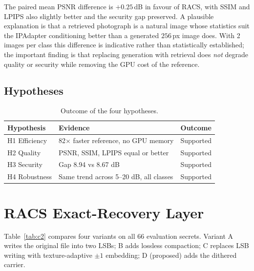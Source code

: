 The paired mean PSNR difference is $+0.25$\,dB in favour of RACS, with SSIM and LPIPS also
slightly better and the security gap preserved. A plausible explanation is that a retrieved
photograph is a natural image whose statistics suit the IPAdapter conditioning better than a
generated $256$\,px image does. With 2 images per class this difference is indicative rather than
statistically established; the important finding is that replacing generation with retrieval
does \emph{not} degrade quality or security while removing the GPU cost of the reference.


\subsection{Hypotheses}
\begin{table}[H]
	\centering
	\caption{Outcome of the four hypotheses.}
	\label{tab:hyp}
	\begin{tabularx}{\textwidth}{|l|X|c|}
		\hline
		\textbf{Hypothesis} & \textbf{Evidence} & \textbf{Outcome} \\ \hline
		H1 Efficiency & 82$\times$ faster reference, no GPU memory & Supported \\ \hline
		H2 Quality & PSNR, SSIM, LPIPS equal or better & Supported \\ \hline
		H3 Security & Gap 8.94 vs 8.67 dB & Supported \\ \hline
		H4 Robustness & Same trend across 5--20 dB, all classes & Supported \\ \hline
	\end{tabularx}
\end{table}

\section{RACS Exact-Recovery Layer}
Table~\ref{tab:c2} compares four variants on all 66 evaluation secrets. Variant A writes the
original file into two LSBs; B adds lossless compaction; C replaces LSB writing with
texture-adaptive $\pm1$ embedding; D (proposed) adds the dithered carrier.

